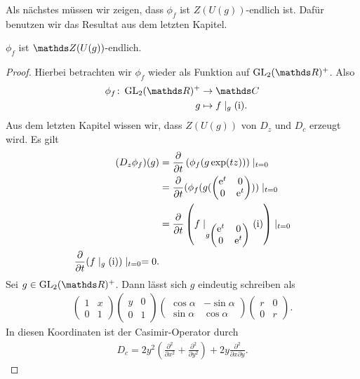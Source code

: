 Als nächstes müssen wir zeigen, dass $\phi_f$ ist $Z(U(g))$-endlich ist.
Dafür benutzen wir das Resultat aus dem letzten Kapitel.
\begin{prop}
$\phi_f$ ist $\Z(U(g))$-endlich.
\end{prop}
\begin{proof}
Hierbei betrachten wir $\phi_f$ wieder als Funktion auf $\GL_2(\R)^+$.
Also
\begin{align*}
\phi_f \colon \GL_2(\R)^+ &\to \C\\
g &\mapsto f\mid_g(\mathrm{i}).
\end{align*}
Aus dem letzten Kapitel wissen wir, dass $Z(U(g))$ von $D_z$ und $D_c$ erzeugt wird.
Es gilt
\begin{align*}
(D_z \phi_f)(g)&= \frac{\partial}{\partial t} \left( \phi_f (g \exp(tz))\right) \mid_{t=0}\\
&=\frac{\partial}{\partial t} (\phi_f(g(\begin{pmatrix}
\mathrm{e}^t &0\\
0 &\mathrm{e}^t
\end{pmatrix}))\mid_{t=0}\\
&=\frac{\partial}{\partial t} \left(f\mid_{g \begin{pmatrix}
\mathrm{e}^t &0\\
0 &\mathrm{e}^t
\end{pmatrix}} (\mathrm{i})\right)\mid_{t=0}\\
\frac{\partial}{\partial t}(f\mid_g(\mathrm{i}))\mid_{t=0}=0.
\end{align*}
Sei $g\in \GL_2(\R)^+$. Dann lässt sich $g$ eindeutig schreiben als
\begin{align*}
\begin{pmatrix}
1 &x\\
0 &1
\end{pmatrix}
\begin{pmatrix}
y &0\\
0 &1
\end{pmatrix}
\begin{pmatrix}
\cos \alpha &-\sin \alpha\\
\sin \alpha &\cos \alpha
\end{pmatrix}
\begin{pmatrix}
r &0\\
0 &r
\end{pmatrix}.
\end{align*}
In diesen Koordinaten ist der Casimir-Operator durch
\begin{align*}
D_c=2y^2\left( \frac{\partial^2}{\partial x^2}+ \frac{\partial^2}{\partial y^2}\right) +2y\frac{\partial ^2}{\partial x \partial y}.

\end{align*}
\end{proof}
